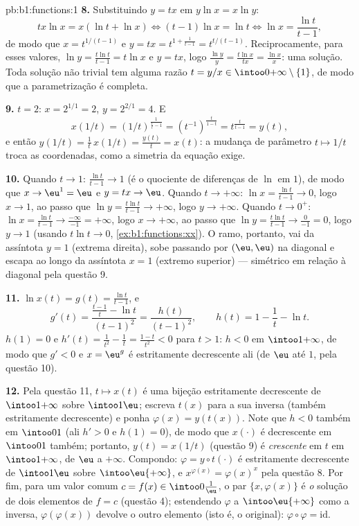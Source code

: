 \begin{solution}{pb:b1:functions:1}
\textbf{8.} Substituindo $y = tx$ em $y\ln x = x\ln y$:
\[
tx\ln x = x(\ln t + \ln x)
\iff (t - 1)\ln x = \ln t
\iff \ln x = \frac{\ln t}{t - 1} ,
\]
de modo que $x = t^{1/(t-1)}$ e $y = tx = t^{1 + \frac1{t-1}} =
t^{t/(t-1)}$. Reciprocamente, para esses valores, $\ln y = \frac{t\ln
t}{t-1} = t\ln x$ e $y = tx$, logo $\frac{\ln y}y = \frac{t\ln
x}{tx} = \frac{\ln x}x$: uma solução. Toda solução não trivial tem
alguma razão $t = y/x \in \intoo0{+\infty} \setminus \{1\}$, de modo que a
parametrização é completa.

\textbf{9.} $t = 2$: $x = 2^{1/1} = 2$, $y = 2^{2/1} = 4$. E
\[
x(1/t) = (1/t)^{\frac1{\frac1t - 1}}
= (t^{-1})^{\frac{t}{1 - t}}
= t^{\frac{t}{t - 1}} = y(t) ,
\]
e então $y(1/t) = \frac1t\,x(1/t) = \frac{y(t)}t = x(t)$: a
mudança de parâmetro $t \mapsto 1/t$ troca as coordenadas, como a
simetria da equação exige.

\textbf{10.} Quando $t \to 1$: $\frac{\ln t}{t-1} \to 1$ (é o
quociente de diferenças de $\ln$ em $1$), de modo que $x \to \eu^1 = \eu$ e
$y = tx \to \eu$. Quando $t \to +\infty$: $\ln x = \frac{\ln t}{t-1}
\to 0$, logo $x \to 1$, ao passo que $\ln y = \frac{t\ln t}{t-1} \to
+\infty$, logo $y \to +\infty$. Quando $t \to 0^+$: $\ln x = \frac{\ln
t}{t-1} \to \frac{-\infty}{-1} = +\infty$, logo $x \to +\infty$,
ao passo que $\ln y = \frac{t\ln t}{t-1} \to \frac{0}{-1} = 0$, logo $y \to
1$ (usando $t\ln t \to 0$, \cref{ex:b1:functions:xx}). O ramo,
portanto, vai da assíntota $y = 1$ (extrema direita), sobe passando por
$(\eu, \eu)$ na diagonal e escapa ao longo da assíntota $x = 1$
(extremo superior) --- simétrico em relação à diagonal pela questão 9.

\textbf{11.} $\ln x(t) = g(t) = \frac{\ln t}{t-1}$, e
\[
g'(t) = \frac{\frac{t-1}t - \ln t}{(t-1)^2}
= \frac{h(t)}{(t-1)^2},
\qquad h(t) = 1 - \frac1t - \ln t .
\]
$h(1) = 0$ e $h'(t) = \frac1{t^2} - \frac1t = \frac{1 -
t}{t^2} < 0$ para $t > 1$: $h < 0$ em $\intoo1{+\infty}$, de modo que $g' <
0$ e $x = \eu^g$ é estritamente decrescente ali (de $\eu$ até
$1$, pela questão 10).

\textbf{12.} Pela questão 11, $t \mapsto x(t)$ é uma bijeção
estritamente decrescente de $\intoo1{+\infty}$ sobre $\intoo1\eu$;
escreva $t(x)$ para a sua inversa (também estritamente decrescente) e
ponha $\varphi(x) = y(t(x))$. Note que $h < 0$ também em $\intoo01$ (ali
$h' > 0$ e $h(1) = 0$), de modo que $x(\cdot)$ é decrescente em
$\intoo01$ também; portanto, $y(t) = x(1/t)$ (questão 9) é
\emph{crescente} em $t$ em $\intoo1{+\infty}$, de $\eu$ a
$+\infty$. Compondo: $\varphi = y \circ t(\cdot)$ é estritamente
decrescente de $\intoo1\eu$ sobre $\intoo\eu{+\infty}$, e
$x^{\varphi(x)} = \varphi(x)^x$ pela questão 8. Por fim, para um
valor comum $c = f(x) \in \intoo0{\frac1\eu}$, o par $\{x,
\varphi(x)\}$ é \emph{o}  solução de dois elementos de $f = c$
(questão 4); estendendo $\varphi$ a $\intoo\eu{+\infty}$ como a
 inversa, $\varphi(\varphi(x))$ devolve o outro elemento (isto é,
o original): $\varphi \circ \varphi = \mathrm{id}$.


\end{solution}
